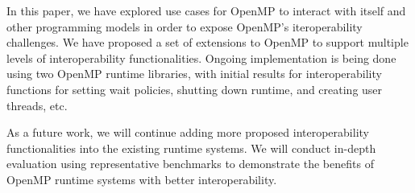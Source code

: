 In this paper, we have explored use cases for OpenMP to interact with itself and other programming models
in order to expose OpenMP's iteroperability challenges. 
We have proposed a set of extensions to OpenMP to support multiple levels of interoperability functionalities. 
Ongoing implementation is being done using two OpenMP runtime libraries, with initial results for 
interoperability functions for setting wait policies, shutting down runtime, and creating user threads, etc. 
\begin{comment}
One feature is 
that allowing the user to create a new OpenMP thread and assign a task to it instead 
of creating new user thread. We have implement a function to allow users to get one 
thread from the existing thread pool is any threads are available, and assign one task 
to this thread, this helps to take advantage of the OpenMP thread pool and won’t need 
to create a new thread to work on it, which helps to save the memory usage and speed up the runtime.

We have studied the waiting policy of the OpenMP and how the current OpenMP Runtime System deals with the thread pool. Considering there are two waiting policies, one called throughput (passive), which is designed to make the program aware of its environment (that is, the system load) and to adjust its resource usage to produce efficient execution in a dynamic environment. While the other one called turnaround (active), which is designed to keep active all of the processors involved in the parallel computation in order to minimize the execution time of a single job. We cannot simply say which one is better than the other, it depends one the executing environment. When setting the wait policy to be passive, after a certain period of time has elapsed, the useless thread will stop waiting and sleep. Thus active mode may be better for high-density of OpenMP tasks. While, a passive mode with a small blocktime value may offer better overall performance if your application contains non-OpenMP threaded code that executes between parallel regions. 

In addition, we have implemented a new function to shutdown the whole runtime library when exiting the parallel region. Since all threads are maintained in the same thread pool, quiesce will reap every threads to free the memory, which sometimes help to clear the runtime environment when the task density is lower and we don’t need to wake up most of the thread in the thread pool. However, when entering new parallel regions, we need to make sure that we register the current working thread as our root thread, so that new runtime environment can be built on it. It cost time to restart another parallel region, thus works slower when lots of tasks in the task queue.
\end{comment}

As a future work, we will continue adding more proposed interoperability functionalities into the existing runtime systems. We will conduct in-depth evaluation using representative benchmarks to demonstrate the benefits of OpenMP runtime systems with better interoperability. 
